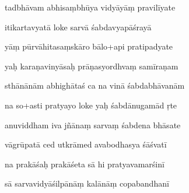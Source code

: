 \documentclass[article,12pt,a4paper]{memoir}%
\newcounter{parCount}
\begin{document}
	  
	  \pstart \leavevmode%
	tadbhāvam abhisaṃbhūya vidyāyāṃ pravilīyate 
	{}
	\pend%
      

	  
	  \pstart {} itikartavyatā loke sarvā śabdavyapāśrayā 
	{}
	\pend%
      

	  
	  \pstart \leavevmode%
	yāṃ pūrvāhitasaṃskāro bālo+api pratipadyate 
	{}
	\pend%
      

	  
	  \pstart {} yaḥ karaṇavinyāsaḥ prāṇasyordhvaṃ samīraṇam 
	{}
	\pend%
      

	  
	  \pstart \leavevmode%
	sthānānām abhighātaś ca na vinā śabdabhāvanām 
	{}
	\pend%
      

	  
	  \pstart {} na so+asti pratyayo loke yaḥ śabdānugamād ṛte 
	{}
	\pend%
      

	  
	  \pstart \leavevmode%
	anuviddham iva jñānaṃ sarvaṃ śabdena bhāsate 
	{}
	\pend%
      

	  
	  \pstart {} vāgrūpatā ced utkrāmed avabodhasya śāśvatī 
	{}
	\pend%
      

	  
	  \pstart \leavevmode%
	na prakāśaḥ prakāśeta sā hi pratyavamarśinī 
	{}
	\pend%
      

	  
	  \pstart {} sā sarvavidyāśilpānāṃ kalānāṃ copabandhanī 
	{}
	\pend%
      
\end{document}
